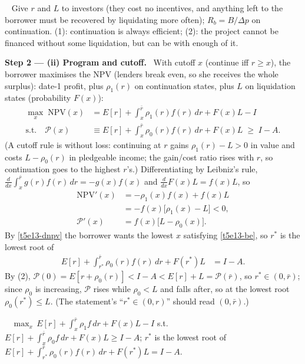 \documentclass[11pt,a4paper]{article}
\newcommand{\step}[2]{\par\medskip\noindent\textbf{Step #1 --- #2.}~}
\newcommand{\answer}[1]{\par\smallskip\noindent\fbox{\textbf{Answer #1.}}~}
\begin{document}
\answer{(i)} Give $r$ and $L$ to investors (they cost no incentives, and anything left to the borrower
must be recovered by liquidating more often); $R_b=B/\Delta p$ on continuation. (1): continuation is always
efficient; (2): the project cannot be financed without some liquidation, but can be with enough of it.

\step{2}{(ii) Program and cutoff} With cutoff $x$ (continue iff $r\ge x$), the borrower maximises the NPV (lenders break even, so
she receives the whole surplus): date-1 profit, plus $\rho_1(r)$ on continuation states, plus $L$ on liquidation states (probability $F(x)$):
\begin{align}
  \max_{x}\;\text{NPV}(x) &= E[r]+\int_{x}^{\bar r}\rho_1(r)f(r)\,dr+F(x)L-I \label{t5e13-npv}\\
  \text{s.t.}\quad \mathcal P(x) &\equiv E[r]+\int_{x}^{\bar r}\rho_0(r)f(r)\,dr+F(x)L \;\ge\; I-A. \label{t5e13-be}
\end{align}
(A cutoff rule is without loss: continuing at $r$ gains $\rho_1(r)-L>0$ in value and costs $L-\rho_0(r)$ in pledgeable income; the gain/cost
ratio rises with $r$, so continuation goes to the highest $r$'s.) Differentiating by Leibniz's rule,
$\frac{d}{dx}\int_x^{\bar r}g(r)f(r)\,dr=-g(x)f(x)$ and $\frac{d}{dx}F(x)L=f(x)L$, so
\begin{align}
  \text{NPV}'(x) &= -\rho_1(x)f(x)+f(x)L \nonumber\\
                 &= -f(x)\big[\rho_1(x)-L\big] < 0, \label{t5e13-dnpv}\\
  \mathcal P'(x) &= f(x)\big[L-\rho_0(x)\big]. \label{t5e13-dP}
\end{align}
By \eqref{t5e13-dnpv} the borrower wants the lowest $x$ satisfying \eqref{t5e13-be}, so $r^*$ is the lowest root of
\begin{align}
  E[r]+\int_{r^*}^{\bar r}\rho_0(r)f(r)\,dr+F(r^*)L &= I-A. \label{t5e13-rstar}
\end{align}
By (2), $\mathcal P(0)=E[r+\rho_0(r)]<I-A<E[r]+L=\mathcal P(\bar r)$, so $r^*\in(0,\bar r)$; since $\rho_0$ is increasing, $\mathcal P$ rises while $\rho_0<L$ and falls after,
so at the lowest root $\rho_0(r^*)\le L$. (The statement's ``$r^*\in(0,r)$'' should read $(0,\bar r)$.)

\answer{(ii)} $\max_x\,E[r]+\int_x^{\bar r}\rho_1f\,dr+F(x)L-I$ s.t.\ $E[r]+\int_x^{\bar r}\rho_0f\,dr+F(x)L\ge I-A$;
$r^*$ is the lowest root of $E[r]+\int_{r^*}^{\bar r}\rho_0(r)f(r)\,dr+F(r^*)L=I-A$.
\end{document}
